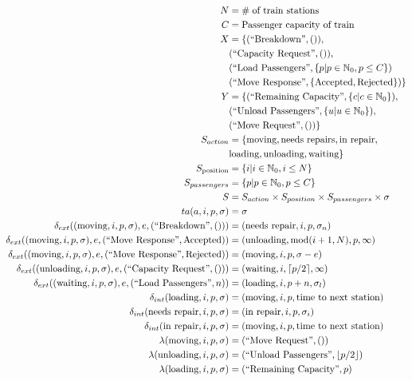 \begin{align*}
    N &= \# \text{\;of train stations} \\
    C &= \text{Passenger capacity of train} \\
    X &= \{
      \InBreakDown, \\
      &  \InCapReq, \\
      &  \InLoadPassengers{\{ p | p \in \mathbb{N}_0, p \leq C \}} \\
      &  \InMoveRes{\{ \text{Accepted}, \text{Rejected} \}}
    \} \\
    Y &= \{
      \OutRemainingCapacity{\{ c | c \in \mathbb{N}_0 \}}, \\
      &  \OutUnloadPassengers{\{ u | u \in \mathbb{N}_0 \}}, \\
      &  \OutMoveReq
    \} \\
    S_{action} &= \{
      \text{moving}, \text{needs repairs}, \text{in repair}, \\
      &  \text{loading}, \text{unloading}, \text{waiting} 
    \} \\
    S_{\text{position}} &= \{ i | i \in \mathbb{N}_0, i \leq N
    \} \\
    S_{passengers} &= \{ p | p \in \mathbb{N}_0, p \leq C \} \\
    S &= S_{action} \times S_{position} \times S_{passengers} \times \sigma \\
    ta(a, i, p, \sigma) &= \sigma \\
    \delta_{ext}((\text{moving}, i, p, \sigma), e, \InBreakDown) &= 
        (\text{needs repair}, i, p, \sigma_n) \\
    \delta_{ext}((\text{moving}, i, p, \sigma), e, \InMoveRes{\text{Accepted}})
        &= (\text{unloading}, \Mod{i+1}{N}, p, \infty) \\
    \delta_{ext}((\text{moving}, i, p, \sigma), e, \InMoveRes{\text{Rejected}})
        &= (\text{moving}, i, p, \sigma - e) \\
    \delta_{ext}((\text{unloading}, i, p, \sigma), e, \InCapReq) &=
        (\text{waiting}, i, \ceil*{p/2}, \infty) \\
    \delta_{ext}((\text{waiting}, i, p, \sigma), e, \InLoadPassengers{n}) &=
        (\text{loading}, i, p + n, \sigma_l) \\
    \delta_{int}(\text{loading}, i, p, \sigma) &= (\text{moving}, i, p,
        \text{time to next station}) \\
    \delta_{int}(\text{needs repair}, i, p, \sigma) &= 
        (\text{in repair}, i, p, \sigma_i) \\
    \delta_{int}(\text{in repair}, i, p, \sigma) &= 
        (\text{moving}, i, p, \text{time to next station}) \\  
    \lambda(\text{moving}, i, p, \sigma) &= \OutMoveReq \\
    \lambda(\text{unloading}, i, p, \sigma) &= \OutUnloadPassengers{\floor*{p/2}} \\
    \lambda(\text{loading}, i, p, \sigma) &= \OutRemainingCapacity{p}
\end{align*}



